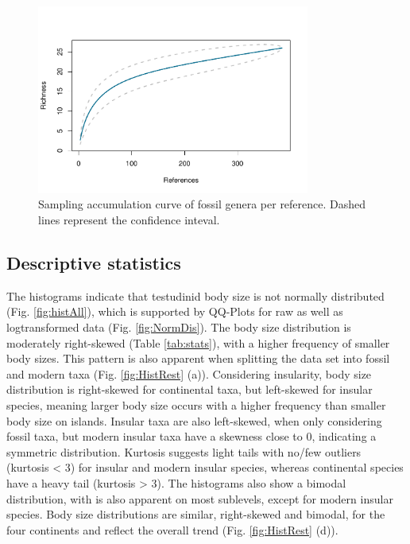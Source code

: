 \begin{figure}[htbp]
	\centering
	\includegraphics[width=0.8\textwidth]{MA_JJ_files/figure-latex/SACGenera-1.pdf}
	\caption[Sampling Accumulation Curve on generic level]{Sampling accumulation curve of fossil genera per reference. Dashed lines represent the confidence inteval.}
	\label{fig:SACGen}
\end{figure}


\FloatBarrier



\subsection{Descriptive statistics}

The histograms indicate that testudinid body size is not normally distributed (Fig. \ref{fig:histAll}), which is supported by QQ-Plots for raw as well as logtransformed data (Fig. \ref{fig:NormDis}).
The body size distribution is moderately right-skewed (Table \ref{tab:stats}), with a higher frequency of smaller body sizes. This pattern is also apparent when splitting the data set into fossil and modern taxa (Fig. \ref{fig:HistRest} (a)). Considering insularity, body size distribution is right-skewed for continental taxa, but left-skewed for insular species, meaning larger body size occurs with a higher frequency than smaller body size on islands. Insular taxa are also left-skewed, when only considering fossil taxa, but modern insular taxa have a skewness close to 0, indicating a symmetric distribution.
Kurtosis suggests light tails with no/few outliers (kurtosis < 3) for insular and modern insular species, whereas continental species have a heavy tail (kurtosis > 3).
The histograms also show a bimodal distribution, with is also apparent on most sublevels, except for modern insular species.
Body size distributions are similar, right-skewed and bimodal, for the four continents and reflect the overall trend (Fig. \ref{fig:HistRest} (d)).

